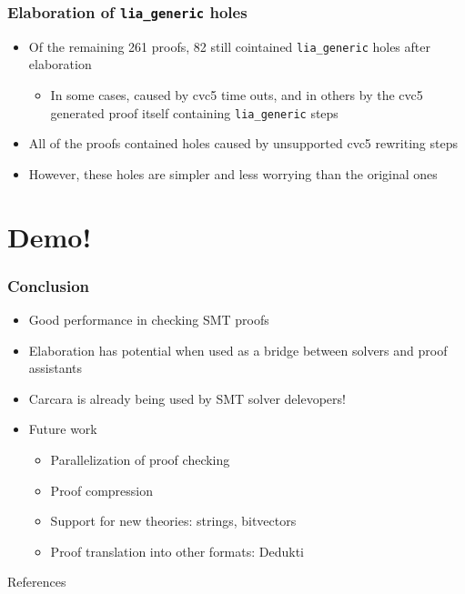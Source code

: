 \documentclass[usepdftitle=false,aspectratio=169]{beamer}
\newcommand\vitem{\vfill\item}
\begin{document}
\begin{frame}
  \frametitle{Elaboration of \texttt{lia\_generic} holes}
  \begin{itemize}
    \item Of the remaining 261 proofs, 82 still cointained \texttt{lia\_generic}
      holes after elaboration
    \begin{itemize}
      \item In some cases, caused by cvc5 time outs, and in others by the cvc5
        generated proof itself containing \texttt{lia\_generic} steps
    \end{itemize}
    \vitem All of the proofs contained holes caused by unsupported cvc5 rewriting steps
    \vitem However, these holes are simpler and less worrying than the original
    ones
  \end{itemize}
\end{frame}

\section{Demo!}

\begin{frame}
  \frametitle{Conclusion}

  \begin{itemize}
    \item Good performance in checking SMT proofs
    \vitem Elaboration has potential when used as a bridge between solvers and
    proof assistants
    \vitem Carcara is already being used by SMT solver delevopers!
    \vitem Future work
    \begin{itemize}
      \item Parallelization of proof checking
      \item Proof compression
      \item Support for new theories: strings, bitvectors
      \item Proof translation into other formats: Dedukti
    \end{itemize}
  \end{itemize}
\end{frame}

\begin{frame}{References}
\printbibliography
\end{frame}
\end{document}
